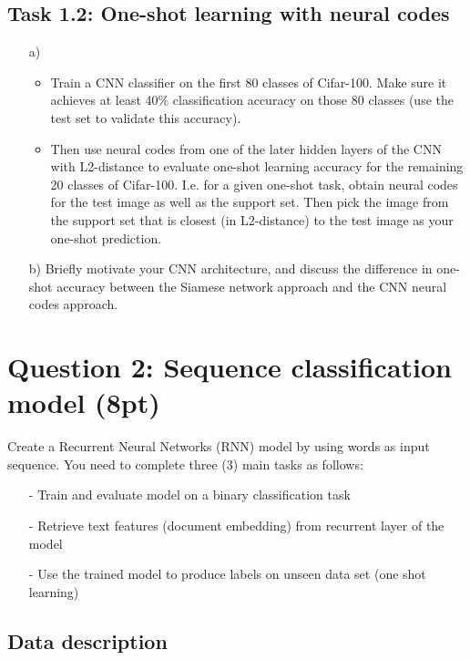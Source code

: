 \documentclass[a4paper,twoside,10pt]{article}
\begin{document}
\subsection*{Task 1.2: One-shot learning with neural codes}
\begin{itemize}
	\item[a)] \begin{itemize}
		\item Train a CNN classifier on the first 80 classes of Cifar-100. Make sure it achieves at least 40\% classification accuracy on those 80 classes (use the test set to validate this accuracy).
		\item Then use neural codes from one of the later hidden layers of the CNN with L2-distance to evaluate one-shot learning accuracy for the remaining 20 classes of Cifar-100. I.e. for a given one-shot task, obtain neural codes for the test image as well as the support set. Then pick the image from the support set that is closest (in L2-distance) to the test image as your one-shot prediction.
	\end{itemize}
	\item[b)] Briefly motivate your CNN architecture, and discuss the difference in one-shot accuracy between the Siamese network approach and the CNN neural codes approach.
\end{itemize}


\section*{Question 2: Sequence classification model (8pt)}

Create a Recurrent Neural Networks (RNN) model by using words as input sequence. You need to complete three (3) main tasks as follows:

\begin{itemize}
    \item[-] Train and evaluate model on a binary classification task
    \item[-] Retrieve text features (document embedding) from recurrent layer of the model
    \item[-] Use the trained model to produce labels on unseen data set (one shot learning) 
\end{itemize}

\subsection*{Data description}
\end{document}
